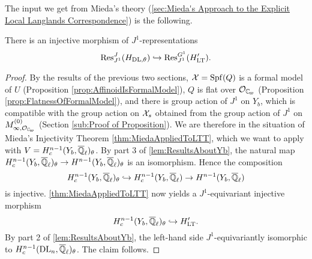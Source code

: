 \documentclass[../main.tex]{subfiles}
\begin{document}
The input we get from Mieda's theory (\cref{sec:Mieda's Approach
to the Explicit Local Langlands Correspondence}) is the
following.
\begin{prop}\label{prop:J1EquivInjMor}
  There is an injective morphism of $J^1$-representations
  \begin{equation*} 
    \mathrm{Res}_{J^1}^J( H_{\mathrm{DL},\theta} ) \hookrightarrow \mathrm{Res}_{J^1}^{G^1}( H'_{\mathrm{LT}}).
  \end{equation*}
  \begin{proof}
    By the results of the previous two sections, $\mathcal{X} = \operatorname{Spf}(Q)$ is a formal
    model of $U$ (Proposition \ref{prop:AffinoidIsFormalModel}), 
    $Q$ is flat over $\cO_\Cp$ (Proposition \ref{prop:FlatnessOfFormalModel}),
    and there is group action of $J^1$ on $Y_b$, which is compatible with the group
    action on $\mathcal{X}_s$ obtained from the group action of $J^1$ on $M_{\infty,
    \cO_\Cp}^{(0)}$ (Section \ref{sub:Proof of Proposition}).
    We are therefore in the situation of Mieda's Injectivity Theorem
    \ref{thm:MiedaAppliedToLTT}, 
    which we want to apply with $V = H^{n-1}_c(Y_b, {\overline {\mathbb{Q}}_\ell})_\theta$. 
    By part 3 of \cref{lem:ResultsAboutYb}, 
    the natural map $H_c^{n-1}(Y_b, {\overline {\mathbb{Q}}_\ell})_\theta \to H^{n-1}(Y_b,
    {\overline {\mathbb{Q}}_\ell})_\theta$ is an isomorphism. Hence the composition
    \begin{equation*}
      H^{n-1}_c(Y_b, {\overline {\mathbb{Q}}_\ell})_\theta \hookrightarrow H^{n-1}_c(Y_b, {\overline {\mathbb{Q}}_\ell})
      \to H^{n-1}(Y_b, {\overline {\mathbb{Q}}_\ell})
    \end{equation*}
    is injective. 
    \cref{thm:MiedaAppliedToLTT} now yields a $J^1$-equivariant injective morphism
    \begin{equation*}
      H_c^{n-1}(Y_b, {\overline {\mathbb{Q}}_\ell})_\theta \hookrightarrow H'_{\mathrm{LT}}.
    \end{equation*}
    By part 2 of \cref{lem:ResultsAboutYb}, the left-hand side
    $J^1$-equivariantly isomorphic to $H_c^{n-1}(\mathrm{DL}_n, {\overline {\mathbb{Q}}_\ell})_\theta$. The
    claim follows.
  \end{proof}
\end{prop}
\end{document}
